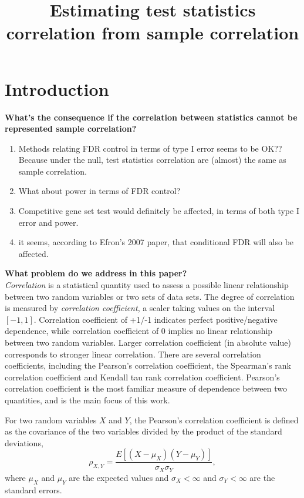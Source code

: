 \documentclass[12pt, a4paper]{article}
\title{Estimating test statistics correlation from sample correlation}
\date{} %
\begin{document}
	\maketitle
	\section{Introduction}
	\textbf{What's the consequence if the correlation between statistics cannot be represented sample correlation?}
	\begin{enumerate}
		\item Methods relating FDR control in terms of type I error seems to be OK?? Because under the null, test statistics correlation are (almost) the same as sample correlation.
		\item What about power in terms of FDR control?
		\item Competitive gene set test would definitely be affected, in terms of both type I error and power.  
		\item it seems, according to Efron's 2007 paper, that conditional FDR will also be affected. 
	\end{enumerate}
	
	\textbf{What problem do we address in this paper?}\\
	\textit{Correlation} is a statistical quantity used to assess a possible linear relationship between two random variables or two sets of data sets. The degree of correlation is measured by \textit{correlation coefficient}, a scaler taking values on the interval $[-1, 1]$. Correlation coefficient of +1/-1 indicates perfect positive/negative dependence, while correlation coefficient of 0 implies no linear relationship between two random variables. Larger correlation coefficient (in absolute value) corresponds to stronger linear correlation. There are several correlation coefficients, including the Pearson's correlation coefficient, the Spearman's rank correlation coefficient and Kendall tau rank correlation coefficient. Pearson's correlation coefficient is the most familiar measure of dependence between two quantities, and is the main focus of this work. 
	
	For two random variables $X$ and $Y$, the Pearson's correlation coefficient is defined as the covariance of the two variables divided by the product of the standard deviations, 
	\begin{equation}
	\rho_{X, Y} = \dfrac{E[(X-\mu_X)(Y-\mu_Y)]}{\sigma_X\sigma_Y}, 
	\end{equation} 
	where $\mu_X$ and $\mu_Y$ are the expected values and $\sigma_X<\infty$ and $\sigma_Y<\infty$ are the standard errors. 
	
\end{document}
